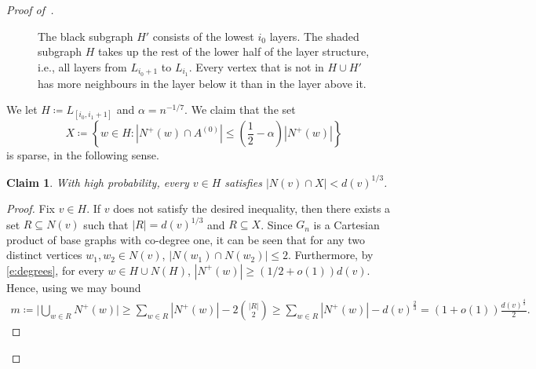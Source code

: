 \documentclass[reqno,a4paper,11pt]{amsart}
\newtheorem{claim}[theorem]{Claim}
\theoremstyle{definition}
\renewcommand{\leq}{\leqslant}
\renewcommand{\geq}{\geqslant}
\begin{document}
\begin{proof}[Proof of~]
\begin{figure}
    \caption{The black subgraph $H'$ consists of the lowest $i_0$ layers. The shaded subgraph $H$ takes up the rest of the lower half of the layer structure, i.e., all layers from $L_{i_0+1}$ to $L_{i_1}$. Every vertex that is not in $H \cup H'$ has more neighbours in the layer below it than in the layer above it.}\label{f:productstars}
  \end{figure}
  We let $H \coloneqq L_{[i_0, i_1+1]}$ and $\alpha=n^{-1/7}$.
  We claim that the set
  \[
    X \coloneqq \left\{w \in H : \left|N^+(w) \cap A^{(0)}\right| \leq \left(\frac{1}{2}-\alpha \right)\left|N^+(w)\right|\right\}
  \]
  is sparse, in the following sense.
  \begin{claim}\label{c:sparse}
    With high probability, every $v \in H$ satisfies $|N(v) \cap X| < d(v)^{1/3}$.
  \end{claim}
  \begin{proof}
    Fix $v \in H$.
    If $v$ does not satisfy the desired inequality, then there exists a set $R \subseteq N(v)$ such that $|R| = d(v)^{1/3}$ and $R \subseteq X$.
    Since $G_n$ is a Cartesian product of base graphs with co-degree one, it can be seen that for any two distinct vertices $w_1, w_2 \in N(v)$, $|N(w_1) \cap N(w_2)| \leq 2$.
    Furthermore, by \eqref{e:degrees}, for every $w \in H \cup N(H)$, $|N^+(w)| \geq (1/2+o(1))d(v)$.
    Hence, using  we may bound
    \begin{align*}
      m\coloneqq\biggl|\bigcup_{w \in R} N^+(w)\biggr| \geq \sum_{w \in R}  |N^+(w)| - 2\binom{|R|}{2} \geq \sum_{w \in R}  |N^+(w)| - d(v)^{\frac{2}{3}} = (1+o(1)) \frac{d(v)^{\frac{4}{3}}}{2}.
    \end{align*}


\end{proof}
\end{proof}
\end{document}
